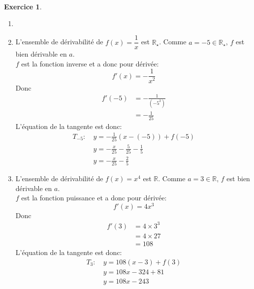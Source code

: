 \documentclass{exam}
\theoremstyle{definition}
\newtheorem{exercice}{Exercice}
\begin{document}
\begin{exercice}
    \begin{enumerate}
        \item[]
        \item L'ensemble de dérivabilité de $f(x) = \dfrac{1}{x}$ est $\mathbb{R}_\star$. Comme $a = -5 \in \mathbb{R}_\star$, $f$ est bien dérivable en $a$.\\
        $f$ est la fonction inverse et a donc pour dérivée:
        $$
            f'(x) = -\frac{1}{x^2}
        $$
        Donc
        \begin{align*}
            f'(-5) &= -\frac{1}{(-5^2)}\\
            &= -\frac{1}{25}
        \end{align*}
        L'équation de la tangente est donc:
        \begin{align*}
            T_{-5}:\ & y = -\frac{1}{25}(x - (-5)) + f(-5)\\
            & y = -\frac{x}{25} - \frac{5}{25} - \frac{1}{5}\\
            & y = -\frac{x}{25} - \frac{2}{5}
        \end{align*}
        \item L'ensemble de dérivabilité de $f(x) = x^4$ est $\mathbb{R}$. Comme $a = 3 \in \mathbb{R}$, $f$ est bien dérivable en $a$.\\
        $f$ est la fonction puissance et a donc pour dérivée:
        $$
            f'(x) = 4x^3
        $$
        Donc
        \begin{align*}
            f'(3) &= 4\times3^3\\
            &= 4\times27\\
            &= 108
        \end{align*}
        L'équation de la tangente est donc:
        \begin{align*}
            T_3:\ & y = 108(x - 3) + f(3)\\
            & y = 108x - 324 + 81\\
        & y = 108x - 243
        \end{align*}
    \end{enumerate}
\end{exercice}
\end{document}
